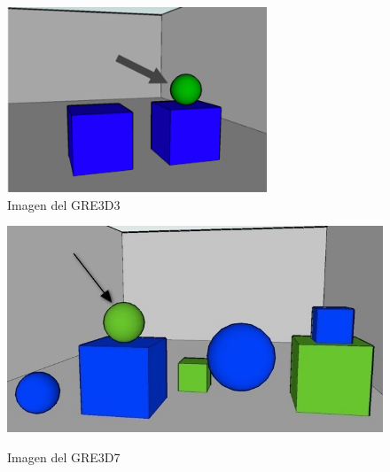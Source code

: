 \begin{figure}[!ht]
\begin{minipage}[b]{0.435\linewidth}
\centering
\includegraphics[width=\textwidth]{images/GRE3D3.png}\\[0pt]
\caption{Imagen del GRE3D3}
\label{fig-GRE3D3}
\end{minipage}
\hspace*{0cm}
\begin{minipage}[b]{0.565\linewidth}
\centering
\includegraphics[width=\textwidth]{images/3.jpg}\\[0pt]
\caption{Imagen del GRE3D7}
\label{fig-GRE3D7}
\end{minipage}
\end{figure}

\vspace*{1cm}

